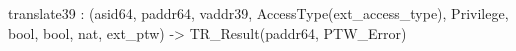 translate39 : (asid64, paddr64, vaddr39, AccessType(ext_access_type), Privilege, bool, bool, nat, ext_ptw) -> TR_Result(paddr64, PTW_Error)